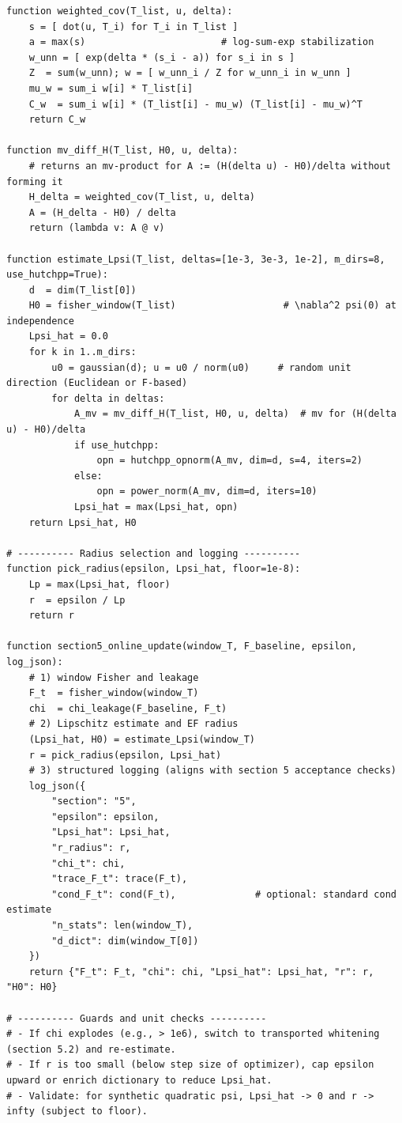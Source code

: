 \begin{lstlisting}
function weighted_cov(T_list, u, delta):
    s = [ dot(u, T_i) for T_i in T_list ]
    a = max(s)                        # log-sum-exp stabilization
    w_unn = [ exp(delta * (s_i - a)) for s_i in s ]
    Z  = sum(w_unn); w = [ w_unn_i / Z for w_unn_i in w_unn ]
    mu_w = sum_i w[i] * T_list[i]
    C_w  = sum_i w[i] * (T_list[i] - mu_w) (T_list[i] - mu_w)^T
    return C_w

function mv_diff_H(T_list, H0, u, delta):
    # returns an mv-product for A := (H(delta u) - H0)/delta without forming it
    H_delta = weighted_cov(T_list, u, delta)
    A = (H_delta - H0) / delta
    return (lambda v: A @ v)

function estimate_Lpsi(T_list, deltas=[1e-3, 3e-3, 1e-2], m_dirs=8, use_hutchpp=True):
    d  = dim(T_list[0])
    H0 = fisher_window(T_list)                   # \nabla^2 psi(0) at independence
    Lpsi_hat = 0.0
    for k in 1..m_dirs:
        u0 = gaussian(d); u = u0 / norm(u0)     # random unit direction (Euclidean or F-based)
        for delta in deltas:
            A_mv = mv_diff_H(T_list, H0, u, delta)  # mv for (H(delta u) - H0)/delta
            if use_hutchpp:
                opn = hutchpp_opnorm(A_mv, dim=d, s=4, iters=2)
            else:
                opn = power_norm(A_mv, dim=d, iters=10)
            Lpsi_hat = max(Lpsi_hat, opn)
    return Lpsi_hat, H0

# ---------- Radius selection and logging ----------
function pick_radius(epsilon, Lpsi_hat, floor=1e-8):
    Lp = max(Lpsi_hat, floor)
    r  = epsilon / Lp
    return r

function section5_online_update(window_T, F_baseline, epsilon, log_json):
    # 1) window Fisher and leakage
    F_t  = fisher_window(window_T)
    chi  = chi_leakage(F_baseline, F_t)
    # 2) Lipschitz estimate and EF radius
    (Lpsi_hat, H0) = estimate_Lpsi(window_T)
    r = pick_radius(epsilon, Lpsi_hat)
    # 3) structured logging (aligns with section 5 acceptance checks)
    log_json({
        "section": "5",
        "epsilon": epsilon,
        "Lpsi_hat": Lpsi_hat,
        "r_radius": r,
        "chi_t": chi,
        "trace_F_t": trace(F_t),
        "cond_F_t": cond(F_t),              # optional: standard cond estimate
        "n_stats": len(window_T),
        "d_dict": dim(window_T[0])
    })
    return {"F_t": F_t, "chi": chi, "Lpsi_hat": Lpsi_hat, "r": r, "H0": H0}

# ---------- Guards and unit checks ----------
# - If chi explodes (e.g., > 1e6), switch to transported whitening (section 5.2) and re-estimate.
# - If r is too small (below step size of optimizer), cap epsilon upward or enrich dictionary to reduce Lpsi_hat.
# - Validate: for synthetic quadratic psi, Lpsi_hat -> 0 and r -> infty (subject to floor).
\end{lstlisting}

